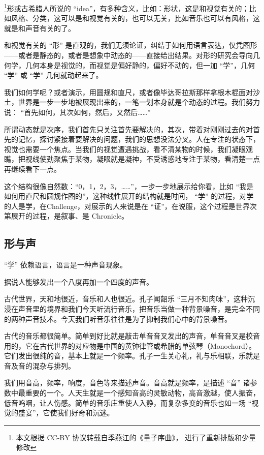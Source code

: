 
\footnote{本文根据 CC-BY 协议转载自季燕江的《量子序曲》， 进行了重新排版和少量修改}形或古希腊人所说的 “idea”，有多种含义，比如：形状，这是和视觉有关的；比如风格、分类，这可以是和视觉有关的，也可以无关，比如音乐也可以有风格，这就是和声音有关的了。

和视觉有关的 “形” 是直观的，我们无须论证，纠结于如何用语言表达，仅凭图形——或者是静态的，或者是想象中动态的——直接给出结果。对形的研究会导向几何学，几何本身是视觉的，而视觉是偏好静的，偏好不动的，但一加 “学”，几何 “学” 或 “学” 几何就动起来了。

我们如何学呢？或者演示，用圆规和直尺，或者像毕达哥拉斯那样拿根木棍面对沙土，世界是一步一步地被展现出来的，一笔一划本身就是个动态的过程。我们努力说： “首先如何，其次如何，然后，又然后……”

所谓动态就是次序，我们首先只关注首先要解决的，其次，带着对刚刚过去的对首先的记忆，探讨紧接着要解决的问题，我们的思想没法分叉。人在专注的状态下，视觉也需要一个焦点。当我们的视觉遭遇挑战，看不清某物的时候，我们凝眼观瞧，把视线使劲聚焦于某物，凝眼就是凝神，不受诱惑地专注于某物，看清楚一点再继续看下一点。

这个结构很像自然数：“0，1，2，3，……”，一步一步地展示给你看，比如 “我是如何用直尺和圆规作图的”，这种线性展开的结构就是时间， “学” 的过程，对学的人是学，在Challenge，对展示的人来说是在 “证”，在说服，这个过程是世界次第展开的过程，是叙事、是 Chronicle。

\subsection{形与声}

“学” 依赖语言，语言是一种声音现象。

据说人能够发出一个八度再加一个四度的声音。

古代世界，天和地很近，音乐和人也很近。孔子闻韶乐 “三月不知肉味”，这种沉浸在声音里的境界和我们今天听流行音乐，把音乐当做一种背景噪音，是完全不同的两种声音技术。今天我们听音乐往往是为了抑制我们心中的背景噪音。

古代的音乐都很简单。简单到好比就是敲击单音音叉发出的声音，单音音叉是校音用的，它在古代世界的对应物是中国的黄钟律管或希腊的单弦琴（Monochord）。它们发出很纯的音，基本上就是一个频率。孔子一生关心礼，礼与乐相联，乐就是音及音的混杂与排列。

我们用音高，频率，响度，音色等来描述声音。音高就是频率，是描述 “音” 诸参数中最重要的一个。人天生就是一个感知音高的灵敏动物，高音激越，使人振奋，低音呜咽，让人伤感。简单的音乐庄重使人入静，而复杂多变的音乐也如一场 “视觉的盛宴”，它使我们好奇和沉迷。

